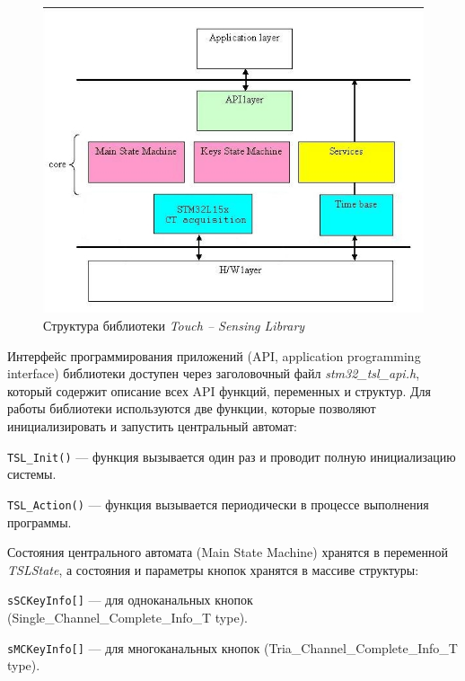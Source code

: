 \begin{figure}[h!]
\begin{center}
\includegraphics[scale=0.6]{Image/61.jpg} 
\end{center}
\caption{Структура библиотеки \textit{Touch --  Sensing Library}}
\end{figure}

Интерфейс программирования приложений (API, application programming interface) библиотеки доступен через заголовочный файл \textit{stm32\_tsl\_api.h}, который содержит описание всех API функций, переменных и структур. Для работы библиотеки используются две функции, которые позволяют инициализировать и запустить центральный автомат:

\verb#TSL_Init()# --- функция вызывается один раз и проводит полную инициализацию системы.

\verb#TSL_Action()# --- функция вызывается периодически в процессе выполнения программы.

Состояния центрального автомата (Main State Machine) хранятся в переменной \textit{TSLState}, а состояния и параметры кнопок хранятся в массиве структуры:

\verb#sSCKeyInfo[]# --- для одноканальных кнопок (Single\_Channel\_Complete\_Info\_T type).

\verb#sMCKeyInfo[]# --- для многоканальных кнопок (Tria\_Channel\_Complete\_Info\_T type).

